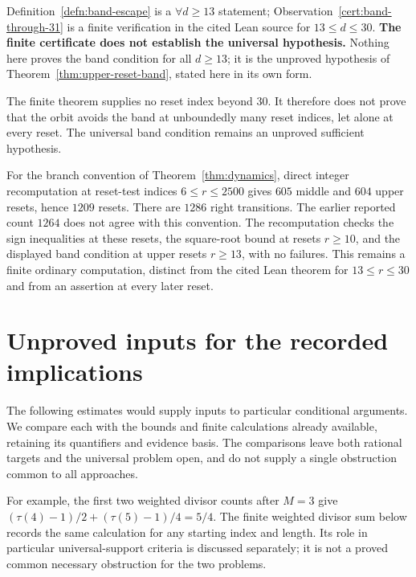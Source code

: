 \begin{rem}
\label{rem:band-caveat}
Definition~\ref{defn:band-escape} is a $\forall d\ge13$ statement; Observation~\ref{cert:band-through-31}
is a finite verification in the cited Lean source for $13\le d\le30$. \textbf{The
finite certificate does not establish the universal hypothesis.} Nothing here proves the band
condition for all $d\ge13$; it is the unproved hypothesis of
Theorem~\ref{thm:upper-reset-band}, stated here in its own form.

\par\medskip

The finite theorem supplies no reset index beyond $30$. It therefore
does not prove that the orbit avoids the band at unboundedly many reset
indices, let alone at every reset. The universal band condition remains
an unproved sufficient hypothesis.

\par\medskip

For the branch convention of Theorem~\ref{thm:dynamics}, direct
integer recomputation at reset-test indices $6\le r\le2500$
gives $605$ middle and $604$ upper resets, hence $1209$ resets.
There are $1286$ right transitions.  The earlier reported count
$1264$ does not agree with this convention.  The recomputation
checks the sign inequalities at these resets, the square-root
bound at resets $r\ge10$, and the displayed band condition at
upper resets $r\ge13$, with no failures.  This remains a finite
ordinary computation, distinct from the cited Lean theorem for
$13\le r\le30$ and from an assertion at every later reset.
\end{rem}
\section{Unproved inputs for the recorded implications}
\label{sec:invent-257}
The following estimates would supply inputs to particular conditional
arguments. We compare each with the bounds and finite calculations
already available, retaining its quantifiers and evidence basis. The
comparisons leave both rational targets and the universal problem open,
and do not supply a single obstruction common to all approaches.

For example, the first two weighted divisor counts after $M=3$
give $(\tau(4)-1)/2+(\tau(5)-1)/4=5/4$.
The finite weighted divisor sum below records the same calculation
for any starting index and length.  Its role in particular universal-support
criteria is discussed separately; it is not a proved common necessary
obstruction for the two problems.

